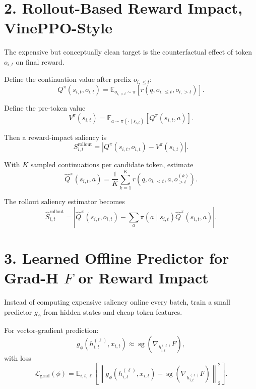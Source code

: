 \documentclass[11pt]{article}
\newcommand{\sg}{\operatorname{sg}}
\newcommand{\E}{\mathbb{E}}
\begin{document}
\section*{2. Rollout-Based Reward Impact, VinePPO-Style}

The expensive but conceptually clean target is the counterfactual effect of
token $o_{i,t}$ on final reward.

Define the continuation value after prefix $o_{i,\le t}$:
\begin{equation}
  Q^\pi(s_{i,t}, o_{i,t})
  =
  \E_{o_{i,>t} \sim \pi}
  \left[
    r(q, o_{i,\le t}, o_{i,>t})
  \right].
\end{equation}

Define the pre-token value
\begin{equation}
  V^\pi(s_{i,t})
  =
  \E_{a \sim \pi(\cdot \mid s_{i,t})}
  \left[
    Q^\pi(s_{i,t}, a)
  \right].
\end{equation}

Then a reward-impact saliency is
\begin{equation}
  S^{\mathrm{rollout}}_{i,t}
  =
  \left|
    Q^\pi(s_{i,t}, o_{i,t})
    -
    V^\pi(s_{i,t})
  \right|.
\end{equation}

With $K$ sampled continuations per candidate token, estimate
\begin{equation}
  \widehat Q^\pi(s_{i,t}, a)
  =
  \frac{1}{K}
  \sum_{k=1}^{K}
  r(q, o_{i,<t}, a, o^{(k)}_{>t}).
\end{equation}

The rollout saliency estimator becomes
\begin{equation}
  \widehat S^{\mathrm{rollout}}_{i,t}
  =
  \left|
    \widehat Q^\pi(s_{i,t}, o_{i,t})
    -
    \sum_{a}
    \pi(a \mid s_{i,t})
    \widehat Q^\pi(s_{i,t}, a)
  \right|.
\end{equation}

\section*{3. Learned Offline Predictor for Grad-H $F$ or Reward Impact}

Instead of computing expensive saliency online every batch, train a small
predictor $g_\phi$ from hidden states and cheap token features.

For vector-gradient prediction:
\begin{equation}
  g_\phi(h^{(\ell)}_{i,t}, x_{i,t})
  \approx
  \sg
  \left(
    \nabla_{h^{(\ell)}_{i,t}} F
  \right),
\end{equation}
with loss
\begin{equation}
  \mathcal{L}_{\mathrm{grad}}(\phi)
  =
  \E_{i,t,\ell}
  \left[
    \left\|
      g_\phi(h^{(\ell)}_{i,t}, x_{i,t})
      -
      \sg
      \left(
        \nabla_{h^{(\ell)}_{i,t}} F
      \right)
    \right\|_2^2
  \right].
\end{equation}
\end{document}
